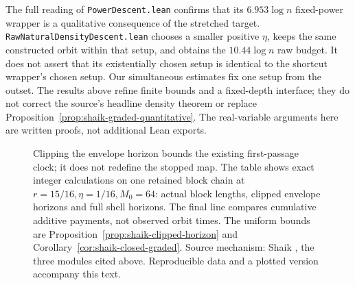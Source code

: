 \documentclass[11pt]{article}
\theoremstyle{remark}\newtheorem{remark}[proposition]{Remark}
\begin{document}
The full reading of \texttt{PowerDescent.lean} confirms that its
\(6.953\log n\) fixed-power wrapper is a qualitative consequence of
the stretched target. \texttt{RawNaturalDensityDescent.lean} chooses
a smaller positive \(\eta\), keeps the same constructed orbit within
that setup, and obtains the \(10.44\log n\) raw budget.
It does not assert that its existentially chosen setup is identical
to the shortcut wrapper's chosen setup. Our simultaneous estimates
fix one setup from the outset.
The results above refine finite bounds and a fixed-depth interface;
they do not correct the source's headline density theorem or replace
Proposition~\ref{prop:shaik-graded-quantitative}.
The real-variable arguments here are written proofs, not additional
Lean exports.

\begin{figure}[ht]
\centering
{}
\caption{Clipping the envelope horizon bounds the existing first-passage
clock; it does not redefine the stopped map. The table shows exact
integer calculations on one retained block chain at
\(r=15/16,\eta=1/16,M_0=64\): actual block lengths, clipped envelope
horizons and full shell horizons. The final line compares cumulative
additive payments, not observed orbit times. The uniform bounds are
Proposition~\ref{prop:shaik-clipped-horizon} and
Corollary~\ref{cor:shaik-closed-graded}. Source mechanism: Shaik
\cite{Shaik2026v324}, the three modules cited above.
Reproducible data and a plotted version accompany this text.}
\end{figure}
\end{document}
